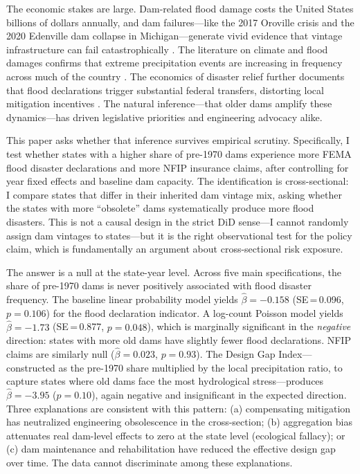 \documentclass[12pt]{article}
\begin{document}
The economic stakes are large. Dam-related flood damage costs the United States billions of dollars annually, and dam failures---like the 2017 Oroville crisis and the 2020 Edenville dam collapse in Michigan---generate vivid evidence that vintage infrastructure can fail catastrophically \citep{nhsa2021}. The literature on climate and flood damages confirms that extreme precipitation events are increasing in frequency across much of the country \citep{kunkel1999}. The economics of disaster relief further documents that flood declarations trigger substantial federal transfers, distorting local mitigation incentives \citep{deryugina2017}. The natural inference---that older dams amplify these dynamics---has driven legislative priorities and engineering advocacy alike.

This paper asks whether that inference survives empirical scrutiny. Specifically, I test whether states with a higher share of pre-1970 dams experience more FEMA flood disaster declarations and more NFIP insurance claims, after controlling for year fixed effects and baseline dam capacity. The identification is cross-sectional: I compare states that differ in their inherited dam vintage mix, asking whether the states with more ``obsolete'' dams systematically produce more flood disasters. This is not a causal design in the strict DiD sense---I cannot randomly assign dam vintages to states---but it is the right observational test for the policy claim, which is fundamentally an argument about cross-sectional risk exposure.

The answer is a null at the state-year level. Across five main specifications, the share of pre-1970 dams is never positively associated with flood disaster frequency. The baseline linear probability model yields $\hat{\beta} = -0.158$ (SE\,=\,0.096, $p = 0.106$) for the flood declaration indicator. A log-count Poisson model yields $\hat{\beta} = -1.73$ (SE\,=\,0.877, $p = 0.048$), which is marginally significant in the \emph{negative} direction: states with more old dams have slightly fewer flood declarations. NFIP claims are similarly null ($\hat{\beta} = 0.023$, $p = 0.93$). The Design Gap Index---constructed as the pre-1970 share multiplied by the local precipitation ratio, to capture states where old dams face the most hydrological stress---produces $\hat{\beta} = -3.95$ ($p = 0.10$), again negative and insignificant in the expected direction. Three explanations are consistent with this pattern: (a) compensating mitigation has neutralized engineering obsolescence in the cross-section; (b) aggregation bias attenuates real dam-level effects to zero at the state level (ecological fallacy); or (c) dam maintenance and rehabilitation have reduced the effective design gap over time. The data cannot discriminate among these explanations.
\end{document}

